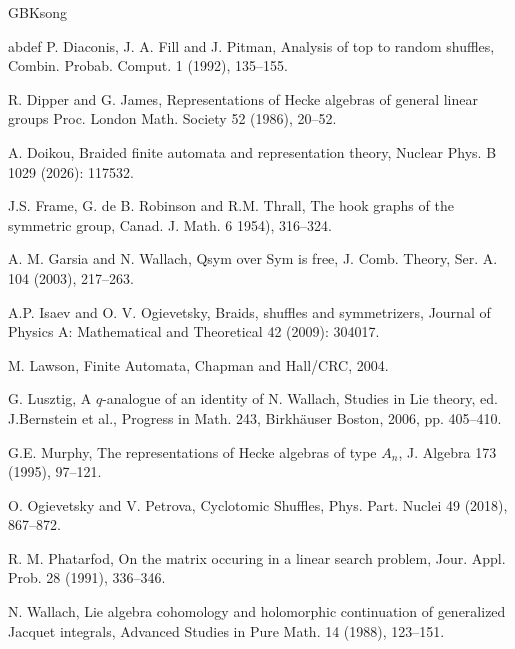 \documentclass[13pt,a4paper, oneside]{amsart}       %
\numberwithin{equation}{section}
\theoremstyle{definition}
\theoremstyle{remark}
\begin{document}
\begin{CJK*}{GBK}{song}
\begin{thebibliography}{abdef}
P. Diaconis, J. A. Fill and J. Pitman, Analysis of top to random shuffles, Combin. Probab. Comput. 1 (1992), 135--155.

R. Dipper and G. James, Representations of Hecke algebras of general linear groups
Proc. London Math. Society 52 (1986), 20--52.

 A. Doikou,  Braided finite automata and representation theory,  Nuclear Phys. B 1029 (2026): 117532.

J.S. Frame, G. de B. Robinson and R.M. Thrall, The hook graphs of the symmetric group, Canad. J. Math. 6 1954), 316--324.

A. M. Garsia and N. Wallach, Qsym over Sym is free, J. Comb. Theory, Ser. A. 104 (2003), 217--263.

A.P. Isaev and O. V. Ogievetsky, Braids, shuffles and symmetrizers, Journal of Physics A: Mathematical and Theoretical 42  (2009): 304017.

 M. Lawson, Finite Automata, Chapman and Hall/CRC, 2004.

G. Lusztig,  A $q$-analogue of an identity of N. Wallach,  Studies in Lie theory, ed. J.Bernstein et al., Progress in Math. 243, Birkh\"{a}user Boston, 2006, pp. 405--410.


G.E. Murphy, The representations of Hecke algebras of type $A_n$, J. Algebra 173 (1995), 97--121.

O. Ogievetsky and V. Petrova, Cyclotomic Shuffles, Phys. Part. Nuclei 49 (2018), 867--872.



    R. M. Phatarfod, On the matrix occuring in a linear search problem, Jour. Appl. Prob.  28 (1991), 336--346.

N. Wallach, Lie algebra cohomology and holomorphic continuation of generalized Jacquet integrals, Advanced Studies in Pure Math. 14 (1988), 123--151.
\end{thebibliography}
\end{CJK*}
\end{document}
